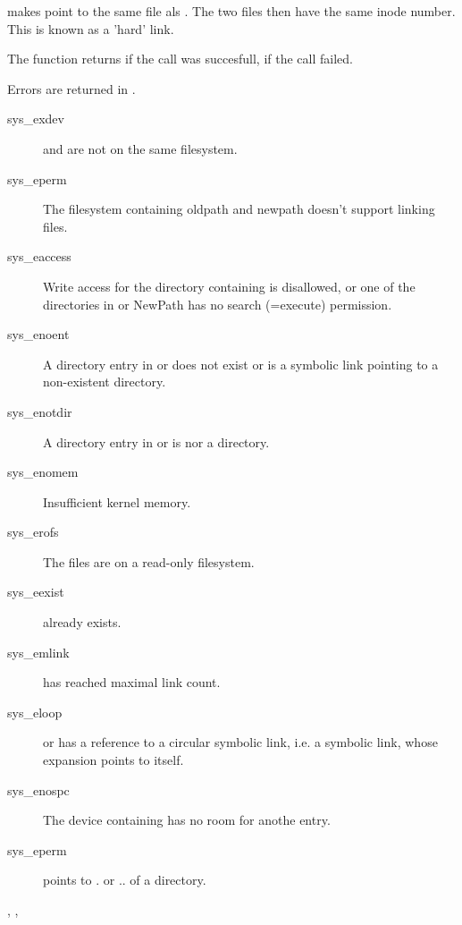 { makes  point to the same file als . The two files
then have the same inode number. This is known as a 'hard' link.

The function returns  if the call was succesfull,  if the call
failed.
}
{ Errors are returned in .
\begin{description}
\item[sys\_exdev]  and  are not on the same
filesystem.
\item[sys\_eperm] The filesystem containing oldpath and newpath doesn't
support linking files.
\item[sys\_eaccess] Write access for the directory containing 
is disallowed, or one of the directories in  or {NewPath} has no
search (=execute) permission.
\item[sys\_enoent] A directory entry in  or  does
not exist or is a symbolic link pointing to a non-existent directory.
\item[sys\_enotdir] A directory entry in  or  is
nor a directory.
\item[sys\_enomem] Insufficient kernel memory.
\item[sys\_erofs] The files are on a read-only filesystem.
\item[sys\_eexist]  already exists.
\item[sys\_emlink]  has reached maximal link count.
\item[sys\_eloop]  or  has a reference to a circular
symbolic link, i.e. a symbolic link, whose expansion points to itself.
\item[sys\_enospc] The device containing  has no room for anothe
entry.
\item[sys\_eperm]  points to . or .. of a directory.
\end{description}
}
{, ,  }



